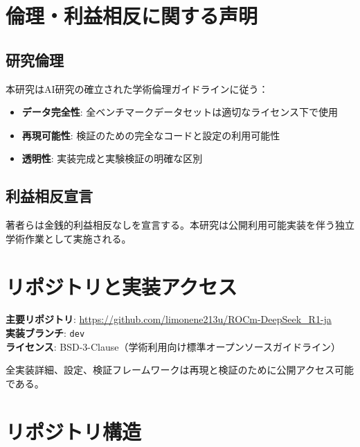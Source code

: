 \documentclass[12pt,a4paper]{article}
\begin{document}
\section{倫理・利益相反に関する声明}

\subsection{研究倫理}

本研究はAI研究の確立された学術倫理ガイドラインに従う：

\begin{itemize}
\item \textbf{データ完全性}: 全ベンチマークデータセットは適切なライセンス下で使用
\item \textbf{再現可能性}: 検証のための完全なコードと設定の利用可能性
\item \textbf{透明性}: 実装完成と実験検証の明確な区別
\end{itemize}

\subsection{利益相反宣言}

著者らは金銭的利益相反なしを宣言する。本研究は公開利用可能実装を伴う独立学術作業として実施される。

\section{リポジトリと実装アクセス}

\textbf{主要リポジトリ}: \url{https://github.com/limonene213u/ROCm-DeepSeek_R1-ja}\\
\textbf{実装ブランチ}: \texttt{dev}\\
\textbf{ライセンス}: BSD-3-Clause（学術利用向け標準オープンソースガイドライン）

全実装詳細、設定、検証フレームワークは再現と検証のために公開アクセス可能である。

\newpage

\appendix

\section{リポジトリ構造}
\end{document}

